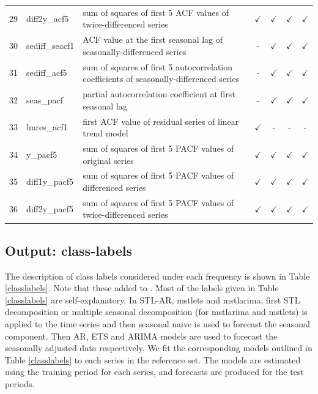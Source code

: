 \documentclass[11pt,a4paper,]{article}
\def\yes{$\checkmark$}
\begin{document}
\begin{table}[!htp]
\begin{tabular}{llp{}cccc}
29 & diff2y\_acf5   & sum of squares of first 5 ACF values of twice-differenced series                        & \yes  & \yes & \yes & \yes \\
30 & sediff\_seacf1 & ACF value at the first seasonal lag of seasonally-differenced series                    & -     & \yes & \yes & \yes\\
31 & sediff\_acf5   & sum of squares of first 5 autocorrelation coefficients of seasonally-differenced series & -     & \yes & \yes & \yes\\
32 & seas\_pacf     & partial autocorrelation coefficient at first seasonal lag & -     & \yes & \yes & \yes\\
33 & lmres\_acf1    & first ACF value of residual series of linear trend model                                & \yes  & - & - & -\\
34 & y\_pacf5       & sum of squares of first 5 PACF values of original series                                & \yes  & \yes & \yes & \yes\\
35 & diff1y\_pacf5  & sum of squares of first 5 PACF values of differenced series                             & \yes  & \yes & \yes & \yes\\
36 & diff2y\_pacf5  & sum of squares of first 5 PACF values of twice-differenced series                       & \yes  & \yes & \yes & \yes\\
\bottomrule
\end{tabular}
\end{table}

\hypertarget{output-class-labels}{%
\subsection{Output: class-labels}\label{output-class-labels}}

The description of class labels considered under each frequency is shown in Table \ref{classlabels}. Note that these added to \textcite{fforms}. Most of the labels given in Table \ref{classlabels} are self-explanatory. In STL-AR, mstlets and mstlarima, first STL decomposition or multiple seasonal decomposition (for mstlarima and mstlets) is applied to the time series and then seasonal naive is used to forecast the seasonal component. Then AR, ETS and ARIMA models are used to forecast the seasonally adjusted data respectively. We fit the corresponding models outlined in Table \ref{classlabels} to each series in the reference set. The models are estimated using the training period for each series, and forecasts are produced for the test periods.
\end{document}
